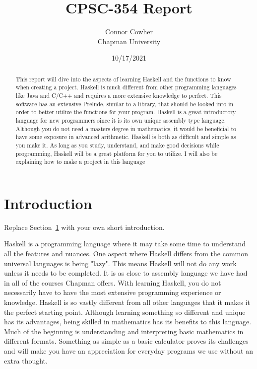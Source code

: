 \documentclass{article}
\title{CPSC-354 Report}
\author{Connor Cowher \\ Chapman University}
\date{10/17/2021}
\begin{document}
\maketitle

\begin{abstract}
This report will dive into the aspects of learning Haskell and the functions to know when creating a project. Haskell is much different from other programming languages like Java and C/C++ and requires a more extensive knowledge to perfect. This software has an extensive Prelude, similar to a library, that should be looked into in order to better utilize the functions for your program. Haskell is a great introductory language for new programmers since it is its own unique assembly type language. Although you do not need a masters degree in mathematics, it would be beneficial to have some exposure in advanced arithmetic. Haskell is both as difficult and simple as you make it. As long as you study, understand, and make good decisions while programming, Haskell will be a great platform for you to utilize. I will also be explaining how to make a project in this language

\end{abstract}

\tableofcontents

\section{Introduction}\label{intro} Replace Section~\ref{intro} with your own short introduction.

Haskell is a programming language where it may take some time to understand all the features and nuances. One aspect where Haskell differs from the common universal languages is being "lazy". This means Haskell will not do any work unless it needs to be completed. It is as close to assembly language we have had in all of the courses Chapman offers. With learning Haskell, you do not necessarily have to have the most extensive programming experience or knowledge. Haskell is so vastly different from all other languages that it makes it the perfect starting point. Although learning something so different and unique has its advantages, being skilled in mathematics has its benefits to this language. Much of the beginning is understanding and interpreting basic mathematics in different formats. Something as simple as a basic calculator proves its challenges and will make you have an appreciation for everyday programs we use without an extra thought. 
\end{document}
